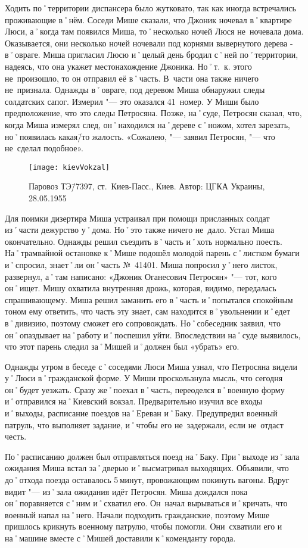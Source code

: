 Ходить по˚территории диспансера было жутковато, так как иногда встречались проживающие в˚нём. Соседи Мише сказали, что Джоник ночевал в˚квартире Люси, а˚когда там появился Миша, то˚несколько ночей Люся не~ночевала дома. Оказывается, они несколько ночей ночевали под корнями вывернутого дерева - в˚овраге. Миша пригласил Люсю и˚целый день бродил с˚ней по˚территории, надеясь, что она укажет местонахождение Джоника. Но˚т.~к. этого не~произошло, то он отправил её в˚часть. В~части она также ничего не~признала. Однажды в˚овраге, под деревом Миша обнаружил следы солдатских сапог. Измерил "--- это оказался 41~номер. У Миши  было предположение, что это следы Петросяна. Позже, на˚суде, Петросян сказал, что, когда Миша измерял след, он˚находился на˚дереве с˚ножом, хотел зарезать, но˚появилась какая\=/то жалость. «Сожалею, "--- заявил Петросян, "--- что не~сделал подобное».  

\begin{wrapfigure}{O}{.4\textwidth}
\centering
\texttt{[image: kievVokzal]}
\caption{Паровоз ТЭ\=/7397, ст.~Киев-Пасс., Киев. Автор: ЦГКА Украины, 28.05.1955}
\label{fig:kievVokzal}
\end{wrapfigure}

Для поимки дизертира Миша устраивал при помощи присланных солдат из˚части дежурство у˚дома. Но˚это также ничего не~дало. Устал Миша окончательно. Однажды решил съездить в˚часть и˚хоть нормально поесть. На˚трамвайной остановке к˚Мише подошёл молодой парень с˚листком бумаги и˚спросил, знает˚ли он˚часть №~41401. Миша попросил у˚него листок, развернул, а˚там написано: «Джоник Оганесович Петросян» "--- тот, кого он˚ищет. Мишу охватила внутренняя дрожь, которая, видимо, передалась спрашивающему. Миша решил заманить его в˚часть и˚попытался спокойным тоном ему ответить, что часть эту знает, сам находится в˚увольнении и˚едет в˚дивизию, поэтому сможет его сопровождать.  Но˚собеседник заявил, что он˚опаздывает на˚работу и˚поспешил уйти. Впоследствии на˚суде выявилось, что этот парень следил за˚Мишей и˚должен был «убрать» его.

Однажды утром в беседе с˚соседями Люси Миша узнал, что Петросяна видели у˚Люси в˚гражданской форме. У Миши проскользнула мысль, что сегодня он˚будет уезжать. Сразу же˚поехал в˚часть, переоделся в˚военную форму и˚отправился на˚Киевский вокзал. Предварительно изучил все входы и˚выходы, расписание поездов на˚Ереван и˚Баку. Предупредил военный патруль, что выполняет задание, и˚чтобы его не~задержали, если не~отдаст честь. 

По˚расписанию должен был отправляться поезд на˚Баку. При˚выходе из˚зала ожидания Миша встал за˚дверью и˚высматривал выходящих. Объявили, что до˚отхода поезда оставалось 5\,минут, провожающим покинуть вагоны. Вдруг видит "--- из˚зала ожидания идёт Петросян. Миша дождался пока он˚поравняется с˚ним и˚схватил его. Он~начал вырываться и˚кричать, что военный напал на˚него. Начали подходить гражданские, поэтому Мише пришлось крикнуть военному патрулю, чтобы помогли. Они~схватили его и на˚машине вместе с˚Мишей доставили к˚коменданту города. 

